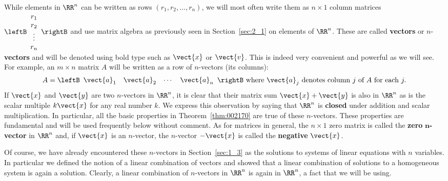 While elements in $\RR^{n}$ can be written as rows $(r_{1}, r_{2}, \dots, r_{n})$,  we will most often 
write them as $n \times 1$  column matrices  $\leftB \begin{array}{c}
r_{1} \\
r_{2} \\
\vdots \\
r_{n}
\end{array} \rightB$ and use matrix algebra as previously seen in Section~\ref{sec:2_1} on elements of $\RR^{n}$.  These are called \textbf{vectors} or $n$-\textbf{vectors} and will be denoted using bold type such as $\vect{x}$ or $\vect{v}$. This is indeed very convenient and powerful as we will see. For example, an $m \times n$ matrix $A$ will be written as a row of $n$-vectors (its columns):
\begin{equation*}
A = \leftB \begin{array}{cccc}
\vect{a}_{1} & \vect{a}_{2} & \cdots & \vect{a}_{n}
\end{array} \rightB \mbox{ where } \vect{a}_{j} \mbox{ denotes column } j \mbox{ of } A \mbox{ for each } j.
\end{equation*}
If $\vect{x}$ and $\vect{y}$ are two $n$-vectors in $\RR^n$, it is clear that their matrix sum $\vect{x} + \vect{y}$ is also in $\RR^n$ as is the scalar multiple $k\vect{x}$ for any real number $k$. We express this observation by saying that $\RR^n$ is \textbf{closed} under addition and scalar multiplication. In particular, all the basic properties in Theorem~\ref{thm:002170} are true of these $n$-vectors. These properties are fundamental and will be used frequently below without comment. As for matrices in general, the $n \times 1$ zero matrix is called the \textbf{zero} $\bm{n}$\textbf{-vector} in $\RR^n$ and, if $\vect{x}$ is an $n$-vector, the $n$-vector $-\vect{x}$ is called the \textbf{negative} $\vect{x}$.


Of course, we have already encountered these $n$-vectors in Section~\ref{sec:1_3} as the solutions to systems of linear equations with $n$ variables. In particular we defined the notion of a linear combination of vectors and showed that a linear combination of solutions to a homogeneous system is again a solution. Clearly, a linear combination of $n$-vectors in $\RR^n$ is again in $\RR^n$, a fact that we will be using.

